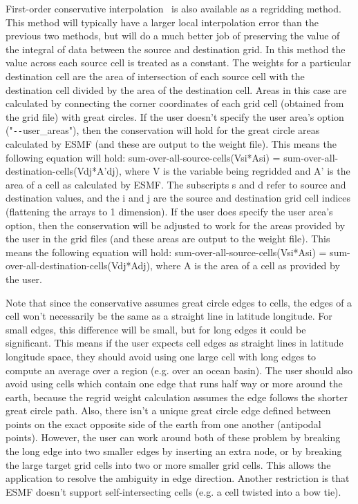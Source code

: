 First-order conservative interpolation~\cite{ConservativeOrder1} is also available as a regridding method. This method will typically have
a larger local interpolation error than the previous two methods, but will do a much better job of preserving the value of the
integral of data between the source and destination grid. In this method the value across each source cell
is treated as a constant. The weights for a particular destination cell are the area of intersection of each
source cell with the destination cell divided by the area of the destination cell.
Areas in this case are calculated by connecting the corner coordinates of each grid cell (obtained from the grid file) with great circles. If the user doesn't specify
the user area's option ("\verb+--+user\_areas"), then the conservation will hold for the great circle areas calculated by
ESMF (and these are output to the weight file). This means the following equation will hold:  sum-over-all-source-cells(Vsi*Asi) = sum-over-all-destination-cells(Vdj*A'dj), where
V is the variable being regridded and A' is the area of a cell as calculated by ESMF.  The subscripts s and d refer to source and destination values, and the i and j are the source
and destination grid cell indices (flattening the arrays to 1 dimension). If the user does specify the user area's option, then the conservation will be adjusted to work for the areas
provided by the user in the grid files (and these areas are output to the weight file). This means the following equation will hold:  sum-over-all-source-cells(Vsi*Asi) = sum-over-all-destination-cells(Vdj*Adj), where A is the area of a cell as provided by the user.

Note that since the conservative assumes great circle edges to cells, the edges of a cell won't necessarily be
the same as a straight line in latitude longitude. For small edges, this difference will be small, but for long edges it could be significant. This means if
the user expects cell edges as straight lines in latitude longitude space, they should avoid using one large cell with long edges to compute an average over a region (e.g. over an ocean basin). The
user should also avoid using cells which contain one edge that runs half way or more around the earth, because the regrid weight calculation assumes the
edge follows the shorter great circle path. Also, there isn't a unique great circle edge defined between points on the exact opposite side of the earth from one another (antipodal points).
However, the user can work around both of these problem by breaking the long edge into two smaller edges by inserting an extra node, or by breaking the large target grid cells into two or more smaller grid cells.
This allows the application to resolve the ambiguity in edge direction. Another restriction is that ESMF doesn't support self-intersecting cells (e.g. a cell twisted into a 
bow tie). 

